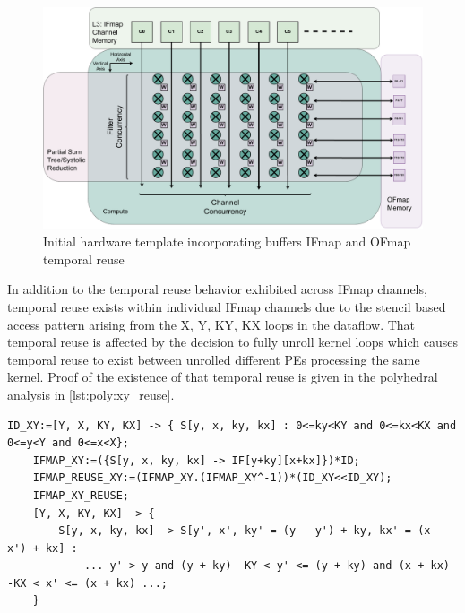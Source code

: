 \begin{figure}[]
    \centering
    \includegraphics[scale=0.4]{fig/reuse_illus.pdf}
    \caption{Initial hardware template incorporating buffers IFmap and OFmap temporal reuse}
    \label{fig:reuse_illus}
\end{figure}

In addition to the temporal reuse behavior exhibited across IFmap channels,
temporal reuse exists within individual IFmap channels due to the stencil based
access pattern arising from the X, Y, KY, KX loops in the dataflow. That
temporal reuse is affected by the decision to fully unroll kernel loops which
causes temporal reuse to exist between unrolled different PEs processing the
same kernel. Proof of the existence of that temporal reuse is given in the polyhedral analysis in
\autoref{lst:poly:xy_reuse}. 

\begin{lstlisting}[caption=Analysis of IFmap channel reuse, label={lst:poly:xy_reuse}]
    ID_XY:=[Y, X, KY, KX] -> { S[y, x, ky, kx] : 0<=ky<KY and 0<=kx<KX and 0<=y<Y and 0<=x<X};
    IFMAP_XY:=({S[y, x, ky, kx] -> IF[y+ky][x+kx]})*ID;
    IFMAP_REUSE_XY:=(IFMAP_XY.(IFMAP_XY^-1))*(ID_XY<<ID_XY);
    IFMAP_XY_REUSE;
    [Y, X, KY, KX] -> { 
        S[y, x, ky, kx] -> S[y', x', ky' = (y - y') + ky, kx' = (x - x') + kx] : 
            ... y' > y and (y + ky) -KY < y' <= (y + ky) and (x + kx) -KX < x' <= (x + kx) ...;
    }
\end{lstlisting}

